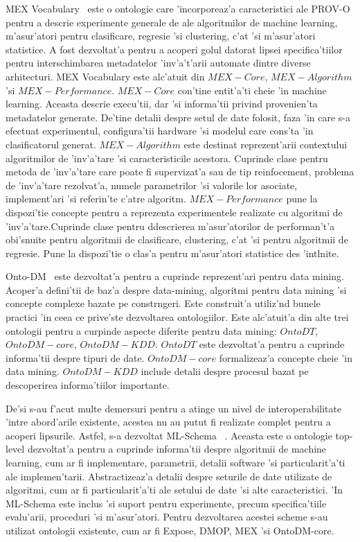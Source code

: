 \documentclass[12pt,a4paper,twoside]{report}
\begin{document}
 
 
 MEX Vocabulary~\cite{Esteves2015MEXVocabulary} este o ontologie care 'incorporeaz'a caracteristici ale PROV-O pentru a descrie experimente generale de ale algoritmilor de machine learning, m'asur'atori pentru clasificare, regresie 'si clustering, c'at 'si m'asur'atori statistice. A fost dezvoltat'a pentru a acoperi golul datorat lipsei specifica'tiilor pentru interschimbarea metadatelor 'inv'a't'arii automate dintre diverse arhitecturi. MEX Vocabulary este alc'atuit din $MEX-Core$, $MEX-Algorithm$ 'si $MEX-Performance$. $MEX-Core$ con'tine entit'a'ti cheie 'in machine learning. Aceasta descrie execu'tii, dar 'si informa'tii privind provenien'ta metadatelor generate. De'tine detalii despre setul de date folosit, faza 'in care s-a efectuat experimentul, configura'tii hardware 'si modelul care cons'ta 'in clasificatorul generat.
 $MEX-Algorithm$ este destinat reprezent'arii contextului algoritmilor de 'inv'a'tare 'si caracteristicile acestora. Cuprinde clase pentru metoda de 'inv'a'tare care poate fi supervizat'a sau de tip reinfocement, problema de 'inv'a'tare rezolvat'a, numele parametrilor 'si valorile lor asociate, implement'ari 'si referin'te c'atre algoritm. 
 $MEX-Performance$ pune la dispozi'tie concepte pentru a reprezenta experimentele realizate cu algoritmi de 'inv'a'tare.Cuprinde clase pentru ddescrierea m'asur'atorilor de performan't'a obi'snuite pentru algoritmii de clasificare, clustering, c'at 'si pentru algoritmii de regresie. Pune la dispozi'tie o clas'a pentru m'asur'atori statistice des 'int\ia lnite.

  
 Onto-DM~\cite{Panov2008OntoDM:Mining} este dezvoltat'a pentru a cuprinde reprezent'ari pentru data mining. Acoper'a defini'tii de baz'a despre data-mining, algoritmi pentru data mining 'si concepte complexe bazate pe constr\ia ngeri. Este construit'a utiliz'nd bunele practici 'in ceea ce prive'ste dezvoltarea ontologiilor. Este alc'atuit'a din alte trei ontologii pentru a curpinde aspecte diferite pentru data mining: $OntoDT$, $OntoDM-core$, $OntoDM-KDD$. $OntoDT$ este dezvoltat'a pentru a cuprinde informa'tii despre tipuri de date. $OntoDM-core$ formalizeaz'a concepte cheie 'in data mining. $OntoDM-KDD$ include detalii despre procesul bazat pe descoperirea informa'tiilor importante.
 
 
 
De'si s-au f'acut multe demersuri pentru a atinge un nivel de interoperabilitate 'intre abord'arile existente, acestea nu au putut fi realizate complet pentru a acoperi lipsurile. Astfel, s-a dezvoltat ML-Schema ~\cite{CorreaPublioML-Schema:Ontologies}. Aceasta este o ontologie top-level dezvoltat'a pentru a cuprinde informa'tii despre algoritmii de machine learning, cum ar fi implementare, parametrii, detalii software 'si particularit'a'ti ale implemen'tarii. Abstractizeaz'a detalii despre seturile de date utilizate de algoritmi, cum ar fi particularit'a'ti ale setului de date 'si alte caracteristici. 'In ML-Schema este inclus 'si suport pentru experimente, precum specifica'tiile evalu'arii, proceduri 'si m'asur'atori. Pentru dezvoltarea acestei scheme s-au utilizat ontologii existente, cum ar fi Expose, DMOP, MEX 'si OntoDM-core. 
\end{document}
